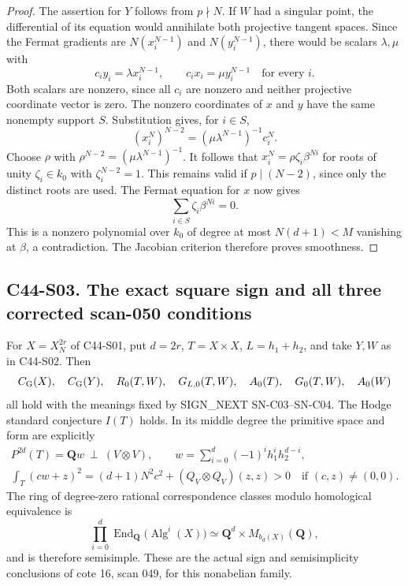 \begin{proof}
The assertion for $Y$ follows from $p\nmid N$.  If $W$ had
a singular point, the differential of its equation would
annihilate both projective tangent spaces.  Since the
Fermat gradients are $N(x_i^{N-1})$ and $N(y_i^{N-1})$,
there would be scalars $\lambda,\mu$ with
\[
 c_iy_i=\lambda x_i^{N-1},\qquad
 c_ix_i=\mu y_i^{N-1}\quad\text{for every }i.
\]
Both scalars are nonzero, since all $c_i$ are nonzero and
neither projective coordinate vector is zero.  The nonzero
coordinates of $x$ and $y$ have the same nonempty support
$S$.  Substitution gives, for $i\in S$,
\[
 (x_i^N)^{N-2}=(\mu\lambda^{N-1})^{-1}c_i^N.
\]
Choose $\rho$ with $\rho^{N-2}=(\mu\lambda^{N-1})^{-1}$.
It follows that
$x_i^N=\rho\zeta_i\beta^{Ni}$ for roots of unity
$\zeta_i\in k_0$ with $\zeta_i^{N-2}=1$.
This remains valid if $p\mid(N-2)$, since only the distinct
roots are used.  The Fermat equation for $x$ now gives
\[
 \sum_{i\in S}\zeta_i\beta^{Ni}=0.
\]
This is a nonzero polynomial over $k_0$ of degree at most
$N(d+1)<M$ vanishing at $\beta$, a contradiction.  The
Jacobian criterion therefore proves smoothness.
\end{proof}

\subsection*{C44-S03. The exact square sign and all three corrected scan-050 conditions}

\begin{theorem}[C44-S03; unconditional]
For $X=X_N^{2r}$ of C44-S01, put $d=2r$, $T=X\times X$,
$L=h_1+h_2$, and take $Y,W$ as in C44-S02.  Then
\[
 C_{\rm G}(X),\quad C_{\rm G}(Y),\quad R_0(T,W),\quad
 G_{L,0}(T,W),\quad A_0(T),\quad G_0(T,W),\quad A_0(W)
\]
all hold with the meanings fixed by SIGN\_NEXT SN-C03--SN-C04.
The Hodge standard conjecture $I(T)$ holds.  In its middle
degree the primitive space and form are explicitly
\begin{gather}
 P^{2d}(T)=\mathbf Qw\ \perp\ (V\otimes V),\qquad
 w=\sum_{i=0}^{d}(-1)^ih_1^ih_2^{d-i},\label{c44:fermat-square-primitive}\\
 \int_T(cw+z)^2=(d+1)N^2c^2+(Q_V\otimes Q_V)(z,z)>0
 \quad\text{if }(c,z)\ne(0,0).\label{c44:fermat-square-sign}
\end{gather}
The ring of degree-zero rational correspondence classes
modulo homological equivalence is
\[
 \prod_{i=0}^{d}\operatorname{End}_{\mathbf Q}
       \bigl(\operatorname{Alg}^i(X)\bigr)
 \simeq \mathbf Q^d\times M_{b_d(X)}(\mathbf Q),
\]
and is therefore semisimple.  These are the actual sign and
semisimplicity conclusions of cote 16, scan 049, for this
nonabelian family.
\end{theorem}

